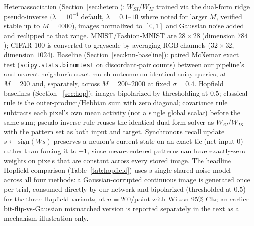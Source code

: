 \documentclass[11pt]{article}
\begin{document}
Heteroassociation (Section~\ref{sec:hetero}): $W_{SI}$/$W_{IS}$ trained via the dual-form
ridge pseudo-inverse ($\lambda=10^{-4}$ default, $\lambda=0.1$--$10$ where noted for
larger $M$, verified stable up to $M{=}4000$), images normalized to $[0,1]$ and Gaussian
noise added and reclipped to that range. MNIST/Fashion-MNIST are $28\times28$ (dimension
$784$); CIFAR-100 is converted to grayscale by averaging RGB channels ($32\times32$,
dimension $1024$). Baseline (Section~\ref{sec:knn-baseline}): paired McNemar exact test
(\texttt{scipy.stats.binomtest} on discordant-pair counts) between our pipeline's and
nearest-neighbor's exact-match outcome on identical noisy queries, at $M{=}200$ and,
separately, across $M{=}200$--$2000$ at fixed $\sigma{=}0.4$. Hopfield baselines (Section~
\ref{sec:hop}): images bipolarized by thresholding at $0.5$; classical rule is the
outer-product/Hebbian sum with zero diagonal; covariance rule subtracts each pixel's own mean
activity (not a single global scalar) before the same sum; pseudo-inverse rule reuses the
identical dual-form solver as $W_{SI}$/$W_{IS}$ with the pattern set as both input and target.
Synchronous recall update $s\leftarrow\mathrm{sign}(Ws)$ preserves a neuron's current state on
an exact tie (net input $0$) rather than forcing it to $+1$, since mean-centered patterns can
have exactly-zero weights on pixels that are constant across every stored image. The
headline Hopfield comparison (Table~\ref{tab:hopfield}) uses a single shared noise model
across all four methods: a Gaussian-corrupted continuous image is generated once per trial,
consumed directly by our network and bipolarized (thresholded at $0.5$) for the three
Hopfield variants, at $n{=}200$/point with Wilson 95\% CIs; an earlier bit-flip-vs-Gaussian
mismatched version is reported separately in the text as a mechanism illustration only.
\end{document}
